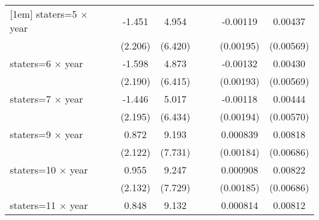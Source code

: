 {\begin{longtable}{l*{8}{c}}
[1em]
staters=5 $\times$ year&                     &                     &      -1.451         &       4.954         &                     &                     &    -0.00119         &     0.00437         \\
                    &                     &                     &     (2.206)         &     (6.420)         &                     &                     &   (0.00195)         &   (0.00569)         \\
[1em]
staters=6 $\times$ year&                     &                     &      -1.598         &       4.873         &                     &                     &    -0.00132         &     0.00430         \\
                    &                     &                     &     (2.190)         &     (6.415)         &                     &                     &   (0.00193)         &   (0.00569)         \\
[1em]
staters=7 $\times$ year&                     &                     &      -1.446         &       5.017         &                     &                     &    -0.00118         &     0.00444         \\
                    &                     &                     &     (2.195)         &     (6.434)         &                     &                     &   (0.00194)         &   (0.00570)         \\
[1em]
staters=9 $\times$ year&                     &                     &       0.872         &       9.193         &                     &                     &    0.000839         &     0.00818         \\
                    &                     &                     &     (2.122)         &     (7.731)         &                     &                     &   (0.00184)         &   (0.00686)         \\
[1em]
staters=10 $\times$ year&                     &                     &       0.955         &       9.247         &                     &                     &    0.000908         &     0.00822         \\
                    &                     &                     &     (2.132)         &     (7.729)         &                     &                     &   (0.00185)         &   (0.00686)         \\
[1em]
staters=11 $\times$ year&                     &                     &       0.848         &       9.132         &                     &                     &    0.000814         &     0.00812         \\

\end{longtable}}
